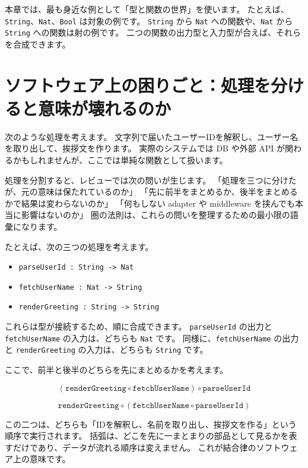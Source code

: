 
本章では、最も身近な例として「型と関数の世界」を使います。
たとえば、\texttt{String}、\texttt{Nat}、\texttt{Bool} は対象の例です。
\texttt{String} から \texttt{Nat} への関数や、\texttt{Nat} から \texttt{String} への関数は射の例です。
二つの関数の出力型と入力型が合えば、それらを合成できます。

\section{ソフトウェア上の困りごと：処理を分けると意味が壊れるのか}

次のような処理を考えます。
文字列で届いたユーザーIDを解釈し、ユーザー名を取り出して、挨拶文を作ります。
実際のシステムでは DB や外部 API が関わるかもしれませんが、ここでは単純な関数として扱います。

処理を分割すると、レビューでは次の問いが生じます。
「処理を三つに分けたが、元の意味は保たれているのか」
「先に前半をまとめるか、後半をまとめるかで結果は変わらないのか」
「何もしない adapter や middleware を挟んでも本当に影響はないのか」
圏の法則は、これらの問いを整理するための最小限の語彙になります。

たとえば、次の三つの処理を考えます。

\begin{itemize}
\item \texttt{parseUserId : String -> Nat}
\item \texttt{fetchUserName : Nat -> String}
\item \texttt{renderGreeting : String -> String}
\end{itemize}

これらは型が接続するため、順に合成できます。
\texttt{parseUserId} の出力と \texttt{fetchUserName} の入力は、どちらも \texttt{Nat} です。
同様に、\texttt{fetchUserName} の出力と \texttt{renderGreeting} の入力は、どちらも \texttt{String} です。

ここで、前半と後半のどちらを先にまとめるかを考えます。

\[
  (\texttt{renderGreeting} \circ \texttt{fetchUserName}) \circ \texttt{parseUserId}
\]

\[
  \texttt{renderGreeting} \circ (\texttt{fetchUserName} \circ \texttt{parseUserId})
\]

この二つは、どちらも「IDを解釈し、名前を取り出し、挨拶文を作る」という順序で実行されます。
括弧は、どこを先に一まとまりの部品として見るかを表すだけであり、データが流れる順序は変えません。
これが結合律のソフトウェア上の意味です。

